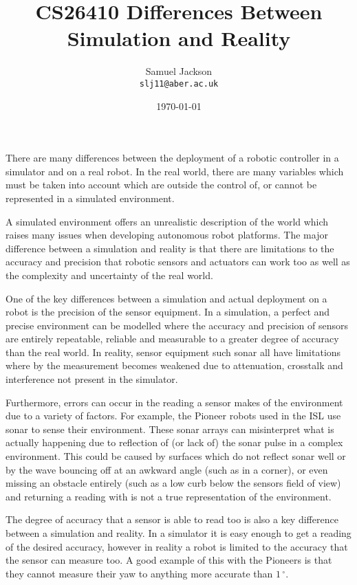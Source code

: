 \documentclass{article}
\begin{document}
\title{CS26410 Differences Between Simulation and Reality}
\author{Samuel Jackson \\ \texttt{slj11@aber.ac.uk}}
\date{\today}
\maketitle

There are many differences between the deployment of a robotic controller in a simulator and on a real robot. 
In the real world, there are many variables which must be taken into account which are outside the control of, 
or cannot be represented in a simulated environment.

A simulated environment offers an unrealistic description of the world which raises many issues when developing 
autonomous robot platforms. The major difference between a simulation and reality is that there are limitations 
to the accuracy and precision that robotic sensors and actuators can work too as well as the complexity and uncertainty
of the real world.

One of the key differences between a simulation and actual deployment on a robot is the precision of the 
sensor equipment. In a simulation, a perfect and precise environment can be modelled where the accuracy and 
precision of sensors are entirely repeatable, reliable and measurable to a greater degree of accuracy than the real world. 
In reality, sensor equipment such sonar all have limitations where by the measurement becomes weakened due to attenuation, 
crosstalk and interference not present in the simulator.

Furthermore, errors can occur in the reading a sensor makes of the environment due to a variety of factors. 
For example, the Pioneer robots used in the ISL use sonar to sense their environment. These sonar arrays can 
misinterpret what is actually happening due to reflection of (or lack of) the sonar pulse in a complex environment. 
This could be caused by surfaces which do not reflect sonar well or by the wave bouncing off at an awkward angle 
(such as in a corner), or even missing an obstacle entirely (such as a low curb below the sensors field of view) 
and returning a reading with is not a true representation of the environment.

The degree of accuracy that a sensor is able to read too is also a key difference between a simulation and reality. 
In a simulator it is easy enough to get a reading of the desired accuracy, however in reality a robot is limited to 
the accuracy that the sensor can measure too. A good example of this with the Pioneers is that they cannot measure their
yaw to anything more accurate than $1\,^{\circ}$.
\end{document}
